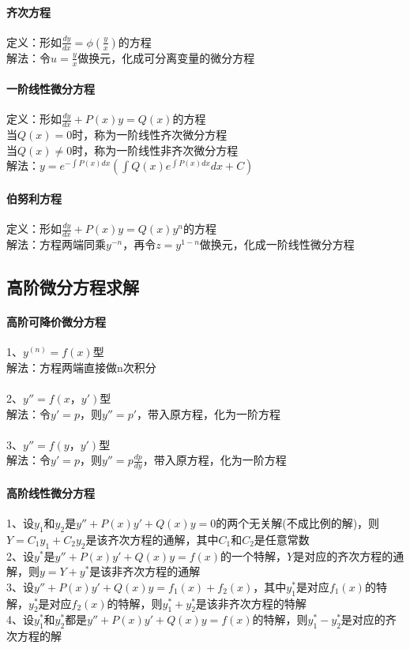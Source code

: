 \documentclass{article}
\begin{document}
\begin{flushleft}
	 \paragraph{齐次方程}
	 定义：形如$\frac{dy}{dx}=\phi(\frac{y}{x})$的方程\\
	 解法：令$u=\frac{y}{x}$做换元，化成可分离变量的微分方程\\
	 
	 \paragraph{一阶线性微分方程}
	 定义：形如$\frac{dy}{dx}+P(x)y=Q(x)$的方程\\
	 当$Q(x)=0$时，称为一阶线性齐次微分方程\\
	 当$Q(x)\neq 0$时，称为一阶线性非齐次微分方程\\
	 解法：$y=e^{-\int P(x)dx}(\int Q(x)e^{\int P(x)dx}dx+C)$\\
	 
	 \paragraph{伯努利方程}
	 定义：形如$\frac{dy}{dx}+P(x)y=Q(x)y^n$的方程\\
	 解法：方程两端同乘$y^{-n}$，再令$z=y^{1-n}$做换元，化成一阶线性微分方程\\
	 
	 \subsection{高阶微分方程求解}
	 
	 \paragraph{高阶可降价微分方程}
	 1、$y^{(n)}=f(x)$型\\
	 解法：方程两端直接做n次积分\\
	 ~\\
	 2、$y''=f(x，y')$型\\
	 解法：令$y'=p$，则$y''=p'$，带入原方程，化为一阶方程\\
	 ~\\
	 3、$y''=f(y，y')$型\\
	 解法：令$y'=p$，则$y''=p\frac{dp}{dy}$，带入原方程，化为一阶方程\\

	 \paragraph{高阶线性微分方程}
	 1、设$y_1$和$y_2$是$y''+P(x)y'+Q(x)y=0$的两个无关解(不成比例的解)，则$Y=C_1y_1+C_2y_2$是该齐次方程的通解，其中$C_1$和$C_2$是任意常数\\
	 2、设$y^*$是$y''+P(x)y'+Q(x)y=f(x)$的一个特解，$Y$是对应的齐次方程的通解，则$y=Y+y^*$是该非齐次方程的通解\\
	 3、设$y''+P(x)y'+Q(x)y=f_1(x)+f_2(x)$，其中$y_1^*$是对应$f_1(x)$的特解，$y_2^*$是对应$f_2(x)$的特解，则$y_1^*+y_2^*$是该非齐次方程的特解\\
	 4、设$y_1^*$和$y_2^*$都是$y''+P(x)y'+Q(x)y=f(x)$的特解，则$y_1^*-y_2^*$是对应的齐次方程的解\\
	 

\end{flushleft}
\end{document}
